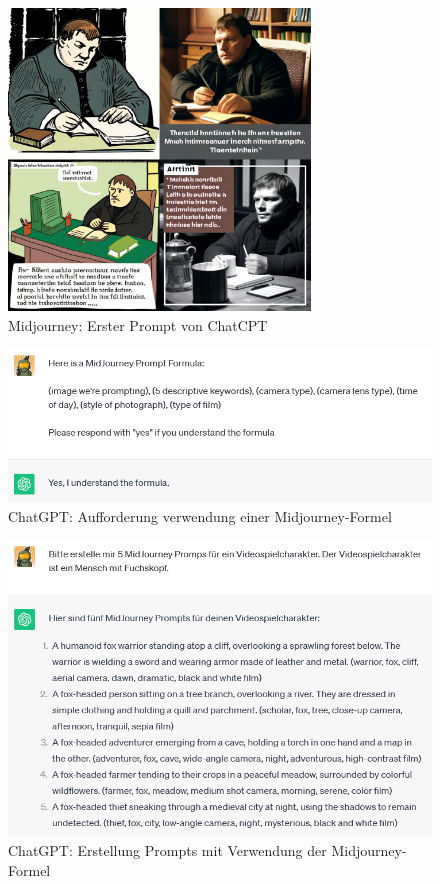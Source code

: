 \documentclass[10pt,a4paper,bibliography=totocnumbered,listof=totocnumbered]{scrartcl}
\begin{document}
\begin{figure}
    \centering
    \includegraphics[width=8.022cm]{BilderFuerBA/MJ/MLaufEnglisch.png}
    \caption{Midjourney: Erster Prompt von ChatCPT}
    \label{Midjourney_erster_Prompt}
\end{figure}

\begin{figure}
    \centering
    \includegraphics[width=14cm]{BilderFuerBA/CGPTMidJourneyMartinLuther/04.png}
    \caption{ChatGPT: Aufforderung verwendung einer Midjourney-Formel}
    \label{chatgpt-ptompt-Midjourney-04}
\end{figure}
\begin{figure}
    \centering
    \includegraphics[width=14cm]{BilderFuerBA/CGPTMidJourneyMartinLuther/05.png}
    \caption{ChatGPT: Erstellung Prompts mit Verwendung der Midjourney-Formel}
    \label{chatgpt_mj-formel_mit_Klammern}
\end{figure}
\end{document}
